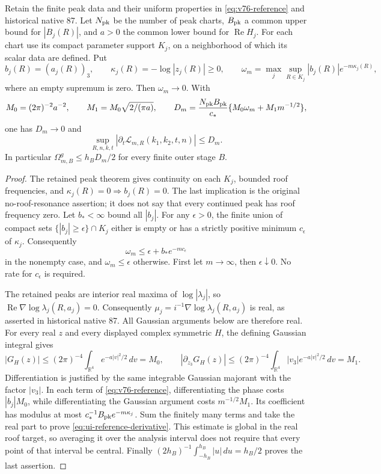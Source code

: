 \begin{lemma}
\label{lem:ui-reference-modulus}
Retain the finite peak data and their uniform properties in
\eqref{eq:v76-reference} and historical native 87. Let $N_{\rm pk}$
be the number of peak charts, $B_{\rm pk}$ a common upper bound for
$|B_j(R)|$, and $a>0$ the common lower bound for
$\operatorname{Re}H_j$. For each chart use its compact parameter
support $K_j$, on a neighborhood of which its scalar data are
defined. Put
\[
 b_j(R)=(a_j(R))_3,\qquad
 \kappa_j(R)=-\log|z_j(R)|\ge0,\qquad
 \omega_m=\max_j\sup_{R\in K_j}
                 |b_j(R)|e^{-m\kappa_j(R)},
\]
where an empty supremum is zero. Then $\omega_m\to0$. With
\[
 M_0=(2\pi)^{-2}a^{-2},\qquad
 M_1=M_0\sqrt{2/(\pi a)},\qquad
 D_m=\frac{N_{\rm pk}B_{\rm pk}}{c_*}
                   \{M_0\omega_m+M_1m^{-1/2}\},
\]
one has $D_m\to0$ and
\begin{equation}\label{eq:ui-reference-derivative}
 \sup_{R,n,k,t}
 \left|\partial_t\mathcal L_{m,R}(k_1,k_2,t,n)\right|
 \le D_m.
\end{equation}
In particular $\Omega^g_{m,B}\le h_BD_m/2$ for every finite
outer stage $B$.
\end{lemma}
\begin{proof}
The retained peak theorem gives continuity on each $K_j$, bounded
roof frequencies, and $\kappa_j(R)=0\Rightarrow b_j(R)=0$.
The last implication is the original no-roof-resonance assertion;
it does not say that every continued peak has roof frequency zero.
Let $b_*<\infty$ bound all $|b_j|$. For any $\epsilon>0$, the
finite union of compact sets $\{|b_j|\ge\epsilon\}\cap K_j$
either is empty or has a strictly positive minimum
$c_\epsilon$ of $\kappa_j$. Consequently
\[
 \omega_m\le\epsilon+b_*e^{-mc_\epsilon}
\]
in the nonempty case, and $\omega_m\le\epsilon$ otherwise.
First let $m\to\infty$, then $\epsilon\downarrow0$. No rate
for $c_\epsilon$ is required.

The retained peaks are interior real maxima of
$\log|\lambda_j|$, so
$\operatorname{Re}\nabla\log\lambda_j(R,a_j)=0$.
Consequently $\mu_j=i^{-1}\nabla\log\lambda_j(R,a_j)$ is real,
as asserted in historical native 87. All Gaussian arguments below
are therefore real. For every real $z$ and every displayed complex symmetric $H$,
the defining Gaussian integral gives
\[
 |G_H(z)|\le (2\pi)^{-4}
       \int_{\mathbb R^4}e^{-a|v|^2/2}\,dv=M_0,
 \qquad
 |\partial_{z_3}G_H(z)|\le (2\pi)^{-4}
       \int_{\mathbb R^4}|v_3|e^{-a|v|^2/2}\,dv=M_1.
\]
Differentiation is justified by the same integrable Gaussian
majorant with the factor $|v_3|$. In each term of
\eqref{eq:v76-reference}, differentiating the phase costs
$|b_j|M_0$, while differentiating the Gaussian argument costs
$m^{-1/2}M_1$. Its coefficient has modulus at most
$c_*^{-1}B_{\rm pk}e^{-m\kappa_j}$. Sum the finitely many terms
and take the real part to prove
\eqref{eq:ui-reference-derivative}. This estimate is global in
the real roof target, so averaging it over the analysis interval
does not require that every point of that interval be central.
Finally
$(2h_B)^{-1}\int_{-h_B}^{h_B}|u|\,du=h_B/2$ proves the last
assertion.
\end{proof}

